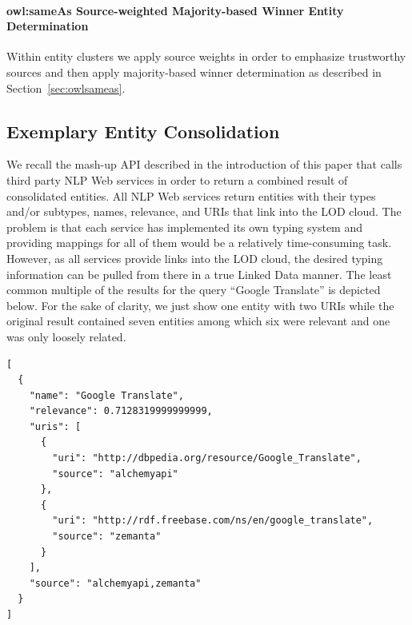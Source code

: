 \documentclass[twocolumn]{article}
\begin{document}
\paragraph{owl:sameAs Source-weighted Majority-based Winner Entity Determination}
Within entity clusters we apply source weights in order to emphasize trustworthy sources and then apply
majority-based winner determination as described in Section~\ref{sec:owlsameas}.

\subsection{Exemplary Entity Consolidation}                     \label{sec:consolidation-nlp}
We recall the mash-up API described in the introduction of this paper that calls third party NLP Web services in order to return a combined result of consolidated entities.
All NLP Web services return entities with their types and/or subtypes, names,
relevance, and URIs that link into the LOD cloud. The problem is that each service has implemented its own typing
system and providing mappings for all of them would be a relatively time-consuming task. However, as all services
provide links into the LOD cloud, the desired typing information can be pulled from there in a true Linked Data manner. The least common
multiple of the results for the query ``Google Translate'' is depicted below. For the sake of clarity, we just show one
entity with two URIs while the original result contained seven entities among which six were relevant and one was only loosely related.
\newpage
\begin{lstlisting}
[
  {
    "name": "Google Translate",
    "relevance": 0.7128319999999999,
    "uris": [
      {
        "uri": "http://dbpedia.org/resource/Google_Translate",
        "source": "alchemyapi"
      },
      {
        "uri": "http://rdf.freebase.com/ns/en/google_translate",
        "source": "zemanta"
      }
    ],
    "source": "alchemyapi,zemanta"
  }
]
\end{lstlisting}
\vspace{2em}
\end{document}
